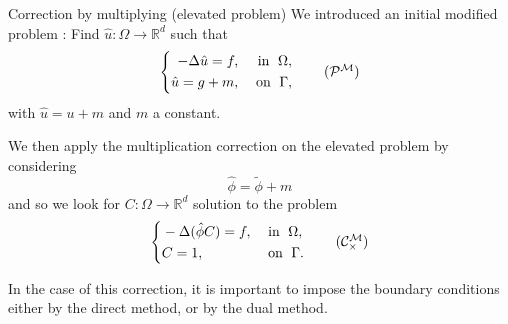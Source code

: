 \documentclass[compress,10pt,xcolor={table,dvipsnames},t]{beamer}
\begin{document}
	\begin{frame}{Correction by multiplying (elevated problem)}
		We introduced an initial modified problem : Find $\hat{u} : \Omega \rightarrow \mathbb{R}^d$ such that
		\begin{equation}
			\left\{
			\begin{aligned}
				-\Delta \hat{u} = f, \; &&\text{in } \; \Omega, \\
				\hat{u}=g+m, \; &&\text{on } \; \Gamma,
			\end{aligned}
			\right. \tag{$\mathcal{P}^\mathcal{M}$} \label{pb_reh}
		\end{equation}
		with $\hat{u}=u+m$ and $m$ a constant.
		
		We then apply the multiplication correction on the elevated problem by considering
		\begin{equation*}
			\hat{\phi}=\tilde{\phi}+m
		\end{equation*}
		and so we look for $C: \Omega \rightarrow \mathbb{R}^d$ solution to the problem
		\begin{equation*}
			\left\{\begin{aligned}
				&-\Delta (\hat{\phi}C)=f, \; &&\text{in } \; \Omega, \\
				&C=1, \; &&\text{on } \; \Gamma.
			\end{aligned}\right. \tag{$\mathcal{C}_\times^\mathcal{M}$} \label{corr_mult_reh}
		\end{equation*}
		
		In the case of this correction, it is important to impose the boundary conditions either by the direct method, or by the dual method.
	\end{frame}
	
\end{document}
